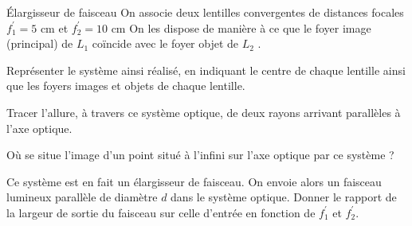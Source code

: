 \begin{exo}[PCSI]{Élargisseur de faisceau}
On associe deux lentilles convergentes de distances focales $f^{'}_1=5$ cm et $f^{'}_2=10$ cm
On les dispose de manière à ce que le foyer image (principal) de $L_1$  coïncide avec le foyer objet de $L_2$ .
\begin{quest}
\item Représenter le système ainsi réalisé, en indiquant le centre de chaque lentille ainsi que les foyers images et objets de chaque lentille.
\item Tracer l'allure, à travers ce système optique, de deux rayons arrivant parallèles à l'axe optique.
\item Où se situe l'image d'un point situé à l'infini sur l'axe optique par ce système ?
\item Ce système est en fait un élargisseur de faisceau. On envoie alors un faisceau lumineux parallèle de diamètre $d$ dans le système optique. Donner le rapport de la largeur de sortie du faisceau sur celle d'entrée en fonction de $f^{'}_1$  et $f^{'}_2$.
\end{quest}
\end{exo}



